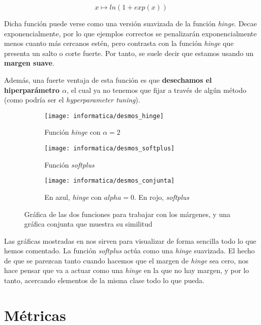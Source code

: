 \begin{equation}
    x \mapsto ln(1 + exp(x))
\end{equation}

Dicha función puede verse como una versión suavizada de la función \textit{hinge}. Decae exponencialmente, por lo que ejemplos correctos se penalizarán exponencialmente menos cuanto más cercanos estén, pero contrasta con la función \textit{hinge} que presenta un salto o corte fuerte. Por tanto, se suele decir que estamos usando un \textbf{margen suave}.

Además, una fuerte ventaja de esta función es que \textbf{desechamos el hiperparámetro $\alpha$}, el cual ya no tenemos que fijar a través de algún método (como podría ser el \textit{hyperparameter tuning}).

\begin{figure}[H]
\centering
    \begin{subfigure}{.5\textwidth}
        \centering
        \texttt{[image: informatica/desmos\_hinge]}
        \caption{Función \textit{hinge} con $\alpha = 2$}
    \end{subfigure}%
    \begin{subfigure}{.5\textwidth}
        \centering
        \texttt{[image: informatica/desmos\_softplus]}
        \caption{Función \textit{softplus}}
    \end{subfigure}

    \begin{subfigure}{.5\textwidth}
        \centering
        \texttt{[image: informatica/desmos\_conjunta]}
        \caption{En azul, \textit{hinge} con $alpha = 0$. En rojo, \textit{softplus}}
    \end{subfigure}


\caption{Gráfica de las dos funciones para trabajar con los márgenes, y una gráfica conjunta que muestra su similitud}
    \label{img:graficas_margenes}
\end{figure}

Las gráficas mostradas en  nos sirven para visualizar de forma sencilla todo lo que hemos comentado. La función \textit{softplus} actúa como una \textit{hinge} suavizada. El hecho de que se parezcan tanto cuando hacemos que el margen de \textit{hinge} sea cero, nos hace pensar que va a actuar como una \textit{hinge} en la que no hay margen, y por lo tanto, acercando elementos de la misma clase todo lo que pueda.

\section{Métricas} \label{isec:metricas_teoria}

